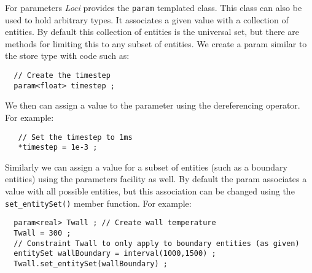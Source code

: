 \documentclass[10pt,epsf,letterpaper,twoside]{book}
\begin{document}
For parameters {\it Loci} provides the {\tt param} templated class.  This
class can also be used to hold arbitrary types.  It associates a given
value with a collection of entities.  By default this collection of
entities is the universal set, but there are methods for limiting this
to any subset of entities.  We create a param similar to the store
type with code such as:
\begin{verbatim}
  // Create the timestep
  param<float> timestep ;
\end{verbatim}
We then can assign a value to the parameter using the dereferencing
{\tt *} operator.  For example:
\begin{verbatim}
   // Set the timestep to 1ms
   *timestep = 1e-3 ;
\end{verbatim}
Similarly we can assign a value for a subset of entities (such as a
boundary entities) using the parameters facility as well.  By default
the param associates a value with all possible entities, but this
association can be changed using the {\tt set\_entitySet()} member
function.  For example:
\begin{verbatim}
  param<real> Twall ; // Create wall temperature
  Twall = 300 ;
  // Constraint Twall to only apply to boundary entities (as given)
  entitySet wallBoundary = interval(1000,1500) ; 
  Twall.set_entitySet(wallBoundary) ;
\end{verbatim}



\end{document}
